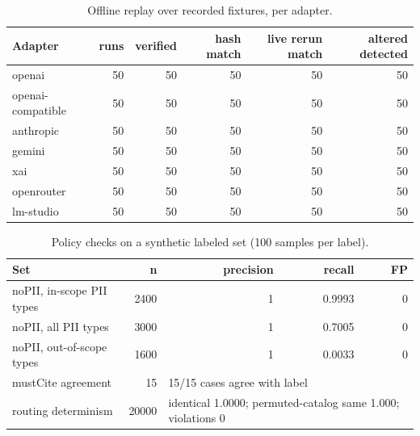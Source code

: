 \begin{table}[t]\centering\caption{Offline replay over recorded fixtures, per adapter.}\label{tab:replay}\scriptsize\begin{tabular}{@{}lrrrrr@{}}\toprule Adapter & runs & verified & hash match & live rerun match & altered detected\\\midrule
openai & 50 & 50 & 50 & 50 & 50\\
openai-compatible & 50 & 50 & 50 & 50 & 50\\
anthropic & 50 & 50 & 50 & 50 & 50\\
gemini & 50 & 50 & 50 & 50 & 50\\
xai & 50 & 50 & 50 & 50 & 50\\
openrouter & 50 & 50 & 50 & 50 & 50\\
lm-studio & 50 & 50 & 50 & 50 & 50\\
\bottomrule\end{tabular}\end{table}
\begin{table}[t]\centering\caption{Policy checks on a synthetic labeled set (100 samples per label).}\label{tab:policy}\scriptsize\begin{tabular}{@{}lrrrr@{}}\toprule Set & n & precision & recall & FP\\\midrule
noPII, in-scope PII types & 2400 & 1 & 0.9993 & 0\\
noPII, all PII types & 3000 & 1 & 0.7005 & 0\\
noPII, out-of-scope types & 1600 & 1 & 0.0033 & 0\\
\midrule mustCite agreement & 15 & \multicolumn{3}{l}{15/15 cases agree with label}\\
routing determinism & 20000 & \multicolumn{3}{l}{identical 1.0000; permuted-catalog same 1.000; violations 0}\\
\bottomrule\end{tabular}\end{table}
